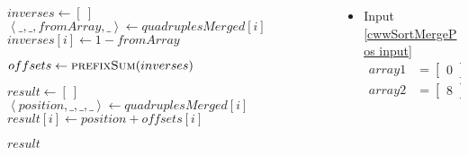 \begin{frame}[containsverbatim]{\cwwalgortihmexampleframe}
\begin{columns}[c]
\begin{column}{0.35\textwidth}
{\begin{minipage}[c]{\textwidth}
\begin{algorithm}[H]
\begin{algorithmic}[1]
                                            \State $inverses \gets \left[\ \right]$
                                                \State $\left<\_, \_, fromArray, \_\right> \gets quadruplesMerged{\left[i\right]}$
                                                \State $inverses{\left[i\right]} \gets 1 - fromArray$
                                            \EndFor
                                            \label{cwwSortMergePos after inverses}

                                            \label{cwwSortMergePos before offsets}
                                            \State $offsets \gets \Call{prefixSum}{inverses}$
                                            \label{cwwSortMergePos after offsets}
            
                                            \State $result \gets \left[\ \right]$
                                                \State $\left<position, \_, \_, \_\right> \gets quadruplesMerged{\left[i\right]}$
                                                \State $result{\left[i\right]} \gets position + offsets{\left[i\right]}$
                                            \EndFor                             
                                            \label{cwwSortMergePos after result}
                
                                            \State \Return $result$
                                        \EndFunction
                                    \end{algorithmic}
                                \end{algorithm}
                            \endgroup
                        \end{minipage}
                    }
                \end{column}

                \begin{column}{0.65\textwidth}
                    \vspace{-0.2cm}
                    \tiny
                    \begin{multicols}{2}
                        \begin{itemize}
                            \item Input \cref{cwwSortMergePos input}
                            \begin{align*}
                                array1 & = \begin{bmatrix}0\end{bmatrix} \\
                                array2 & = \begin{bmatrix}8\end{bmatrix}
                            \end{align*}


\end{itemize}
\end{multicols}
\end{column}
\end{columns}
\end{frame}
